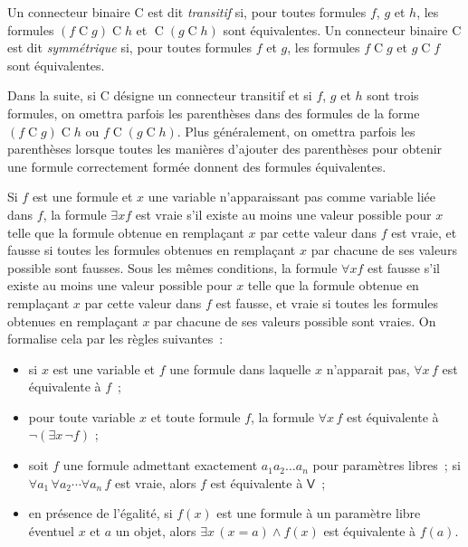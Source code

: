 Un connecteur binaire $\mathrm{C}$ est dit \textit{transitif} si, pour toutes formules $f$, $g$ et $h$, les formules $(f \mathop{\mathrm{C}} g) \mathop{\mathrm{C}} h$ et $\mathop{\mathrm{C}} (g \mathop{\mathrm{C}} h)$ sont équivalentes.
Un connecteur binaire $\mathrm{C}$ est dit \textit{symmétrique} si, pour toutes formules $f$ et $g$, les formules $f \mathop{\mathrm{C}} g$ et $g \mathop{\mathrm{C}} f$ sont équivalentes.

Dans la suite, si $\mathrm{C}$ désigne un connecteur transitif et si $f$, $g$ et $h$ sont trois formules, on omettra parfois les parenthèses dans des formules de la forme $(f \mathop{\mathrm{C}} g) \mathop{\mathrm{C}} h$ ou $f \mathop{\mathrm{C}} (g \mathop{\mathrm{C}} h)$. 
Plus généralement, on omettra parfois les parenthèses lorsque toutes les manières d'ajouter des parenthèses pour obtenir une formule correctement formée donnent des formules équivalentes.

Si $f$ est une formule et $x$ une variable n'apparaissant pas comme variable liée dans $f$, la formule $\exists x f$ est vraie s'il existe au moins une valeur possible pour $x$ telle que la formule obtenue en remplaçant $x$ par cette valeur dans $f$ est vraie, et fausse si toutes les formules obtenues en remplaçant $x$ par chacune de ses valeurs possible sont fausses. 
Sous les mêmes conditions, la formule $\forall x f$ est fausse s'il existe au moins une valeur possible pour $x$ telle que la formule obtenue en remplaçant $x$ par cette valeur dans $f$ est fausse, et vraie si toutes les formules obtenues en remplaçant $x$ par chacune de ses valeurs possible sont vraies. 
On formalise cela par les règles suivantes : 
\begin{itemize}
    \item si $x$ est une variable et $f$ une formule dans laquelle $x$ n'apparait pas, $\forall x \, f$ est équivalente à $f$ ; 
    \item pour toute variable $x$ et toute formule $f$, la formule $\forall x \, f$ est équivalente à $\neg (\exists x \, \neg f)$ ;
    \item soit $f$ une formule admettant exactement $a_1 a_2 \dots a_n$ pour paramètres libres ; si $\forall a_1 \, \forall a_2 \cdots \forall a_n \, f$ est vraie, alors $f$ est équivalente à $\mathsf{V}$ ; 
    \item en présence de l'égalité, si $f(x)$ est une formule à un paramètre libre éventuel $x$ et $a$ un objet, alors $\exists x \, (x = a) \wedge f(x)$ est équivalente à $f(a)$.
\end{itemize}

